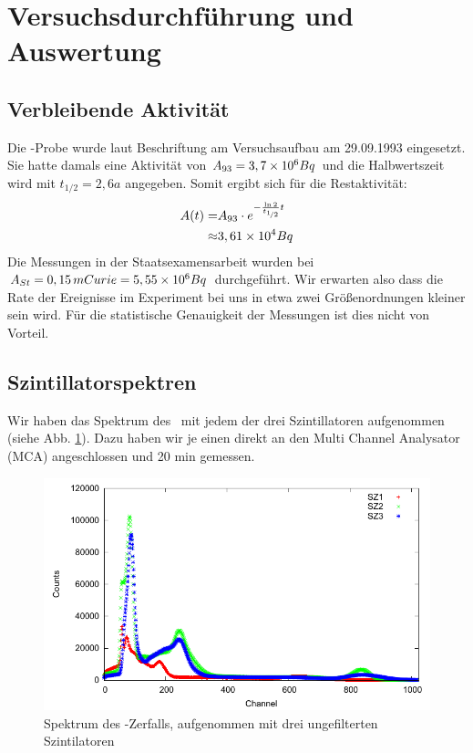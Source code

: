 \section{Versuchsdurchführung und Auswertung}

\subsection{Verbleibende Aktivität}

Die \Na-Probe wurde laut Beschriftung am Versuchsaufbau am 29.09.1993 eingesetzt. Sie hatte damals eine Aktivität von $A_{93} = 3,7\times 10^{6} Bq$ und die Halbwertszeit wird mit $t_{1/2} = 2,6 a$ angegeben. Somit ergibt sich für die Restaktivität:
\begin{eqnarray*}
 A(t) = & A_{93} \cdot e^{-\frac{\ln 2}{t_{\nicefrac{1}{2}}} t} \\
      \approx & 3,61\times 10^{4} Bq
\end{eqnarray*}
\label{verbleibende_aktivitaet}
Die Messungen in der Staatsexamensarbeit wurden bei $A_{St} = 0,15\, mCurie = 5,55\times 10^{6} Bq$ durchgeführt. Wir erwarten also dass die Rate der Ereignisse im Experiment bei uns in etwa zwei Größenordnungen kleiner sein wird. Für die statistische Genauigkeit der Messungen ist dies nicht von Vorteil.

\subsection{Szintillatorspektren}
Wir haben das Spektrum des \Na \ mit jedem der drei Szintillatoren aufgenommen (siehe Abb. \ref{22na-schrottspektrum}). Dazu haben wir je einen direkt an den Multi Channel Analysator (MCA) angeschlossen und 20 min gemessen.

\begin{figure}[ht]
 \includegraphics[width=\textwidth]{Graphen/Na-Spektren/na-spektren-1.pdf}
 \caption{Spektrum des \Na-Zerfalls, aufgenommen mit drei ungefilterten Szintilatoren}
 \label{22na-schrottspektrum}
\end{figure}

